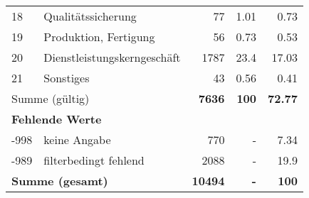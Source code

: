 \begin{longtable}{lXrrr}
        18 & \multicolumn{1}{X}{Qualitätssicherung} & %
          \num{77} &
          \num[round-mode=places,round-precision=2]{1.01} &
          \num[round-mode=places,round-precision=2]{0.73} \\

        19 & \multicolumn{1}{X}{Produktion, Fertigung} & %
          \num{56} &
          \num[round-mode=places,round-precision=2]{0.73} &
          \num[round-mode=places,round-precision=2]{0.53} \\

        20 & \multicolumn{1}{X}{Dienstleistungskerngeschäft} & %
          \num{1787} &
          \num[round-mode=places,round-precision=2]{23.4} &
          \num[round-mode=places,round-precision=2]{17.03} \\

        21 & \multicolumn{1}{X}{Sonstiges} & %
          \num{43} &
          \num[round-mode=places,round-precision=2]{0.56} &
          \num[round-mode=places,round-precision=2]{0.41} \\

     \midrule
     \multicolumn{2}{l}{Summe (gültig)} &
       \textbf{\num{7636}} &
     \textbf{\num{100}} &
       \textbf{\num[round-mode=places,round-precision=2]{72.77}} \\
     \multicolumn{5}{l}{\textbf{Fehlende Werte}}\\
       -998 &
       keine Angabe &
         \num{770} &
        - &
         \num[round-mode=places,round-precision=2]{7.34} \\
       -989 &
       filterbedingt fehlend &
         \num{2088} &
        - &
         \num[round-mode=places,round-precision=2]{19.9} \\
     \midrule
     \multicolumn{2}{l}{\textbf{Summe (gesamt)}} &
          \textbf{\num{10494}} &
        \textbf{-} &
        \textbf{\num{100}} \\
     \bottomrule
     \end{longtable}
     
